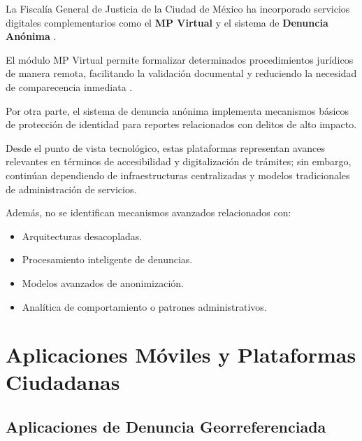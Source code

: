 \begin{flushleft}
\justifying

La Fiscalía General de Justicia de la Ciudad de México ha incorporado servicios digitales complementarios como el \textbf{MP Virtual} y el sistema de \textbf{Denuncia Anónima} \cite{11}.

El módulo MP Virtual permite formalizar determinados procedimientos jurídicos de manera remota, facilitando la validación documental y reduciendo la necesidad de comparecencia inmediata \cite{12}.

Por otra parte, el sistema de denuncia anónima implementa mecanismos básicos de protección de identidad para reportes relacionados con delitos de alto impacto.

Desde el punto de vista tecnológico, estas plataformas representan avances relevantes en términos de accesibilidad y digitalización de trámites; sin embargo, continúan dependiendo de infraestructuras centralizadas y modelos tradicionales de administración de servicios.

Además, no se identifican mecanismos avanzados relacionados con:

\begin{itemize}

    \item Arquitecturas desacopladas.
    \item Procesamiento inteligente de denuncias.
    \item Modelos avanzados de anonimización.
    \item Analítica de comportamiento o patrones administrativos.

\end{itemize}

\end{flushleft}


\section{Aplicaciones Móviles y Plataformas Ciudadanas}

\subsection{Aplicaciones de Denuncia Georreferenciada}

